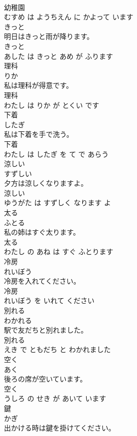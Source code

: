 \documentclass[8pt]{extreport}
\begin{document}
\begin{CJK}{UTF8}{min}
\\	幼稚園 
\\	むすめ は ようちえん に かよって います			
\\	きっと	
\\	明日はきっと雨が降ります。	
\\	きっと 
\\	あした は きっと あめ が ふります			
\\	理科	
\\	りか			
\\	私は理科が得意です。	
\\	理科 
\\	わたし は りか が とくい です			
\\	下着	
\\	したぎ			
\\	私は下着を手で洗う。	
\\	下着 
\\	わたし は したぎ を て で あらう			
\\	涼しい	
\\	すずしい			
\\	夕方は涼しくなりますよ。	
\\	涼しい 
\\	ゆうがた は すずしく なります よ			
\\	太る	
\\	ふとる			
\\	私の姉はすぐ太ります。	
\\	太る 
\\	わたし の あね は すぐ ふとります			
\\	冷房	
\\	れいぼう			
\\	冷房を入れてください。	
\\	冷房 
\\	れいぼう を いれて ください			
\\	別れる	
\\	わかれる			
\\	駅で友だちと別れました。	
\\	別れる 
\\	えき で ともだち と わかれました			
\\	空く	
\\	あく			
\\	後ろの席が空いています。	
\\	空く 
\\	うしろ の せき が あいて います			
\\	鍵	
\\	かぎ			
\\	出かける時は鍵を掛けてください。	

\end{CJK}
\end{document}
